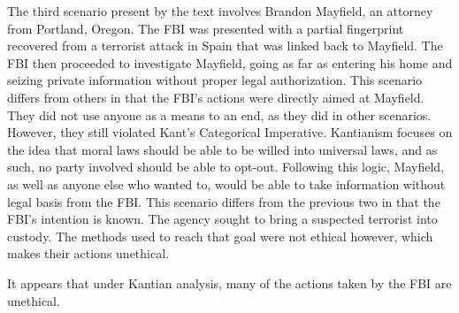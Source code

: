 \documentclass{paper}
\begin{document}
\begin{linenumbers}
The third scenario present by the text involves Brandon Mayfield, an attorney from Portland, Oregon. The FBI was presented with a partial fingerprint recovered from a terrorist attack in Spain that was linked back to Mayfield. The FBI then proceeded to investigate Mayfield, going as far as entering his home and seizing private information without proper legal authorization. This scenario differs from others in that the FBI's actions were directly aimed at Mayfield. They did not use anyone as a means to an end, as they did in other scenarios. However, they still violated Kant's Categorical Imperative. Kantianism focuses on the idea that moral laws should be able to be willed into universal laws, and as such, no party involved should be able to opt-out. Following this logic, Mayfield, as well as anyone else who wanted to, would be able to take information without legal basis from the FBI. This scenario differs from the previous two in that the FBI's intention is known. The agency sought to bring a suspected terrorist into custody. The methods used to reach that goal were not ethical however, which makes their actions unethical.

It appears that under Kantian analysis, many of the actions taken by the FBI are unethical. 
\end{linenumbers}
\newpage
\printbibliography
\end{document}
